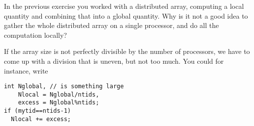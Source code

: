 \begin{comment}
  \begin{exercise}
    \label{ex:sumsquares}
    We want to compute $\sum_{n=1}^Nn^2$, and we do that as follows
    by filling in an array and summing the elements. (Yes, you can do it
    without an array, but for purposes of the exercise do it with.)

    Set a variable \n{N} for the total length of the array, and compute
    the local number of elements. Make sure you handle the case where
    $N$ does not divide perfectly by the number of processes.

    \begin{itemize}
    \item Now allocate the local parts: each processor should allocate
      only local elements, not the whole vector.\\
      (Allocate your array as real numbers. Why are integers not a good idea?)
    \item On each processor, initialize the local array
      so that the $i$-th location of the distributed array
      (for $i=0,\ldots,N-1$)
      contains~$(i+\nobreak 1)^2$.
    \item Now use a collective operation to compute the sum of the array values.
      The right value is $(2N^3+3N^2+N)/6$. Is that what you get?
    \end{itemize}
    (Note that computer arithmetic is not exact: the computed sum will
    only be accurate up to some relative accuracy.)
  \end{exercise}
\end{comment}

\begin{exercise}
  In the previous exercise you worked with a distributed array,
  computing a local quantity and combining that into a global
  quantity.
  Why is it not a good idea to gather the whole distributed array on a
  single processor, and do all the computation locally?
\end{exercise}

If the array size is not perfectly divisible by the number of processors,
we have to come up with a division that is uneven, but not too much.
You could for instance, write

\lstset{style=reviewcode,language=C} %
\begin{lstlisting}
int Nglobal, // is something large
    Nlocal = Nglobal/ntids,
    excess = Nglobal%ntids;
if (mytid==ntids-1) 
  Nlocal += excess;
\end{lstlisting}

